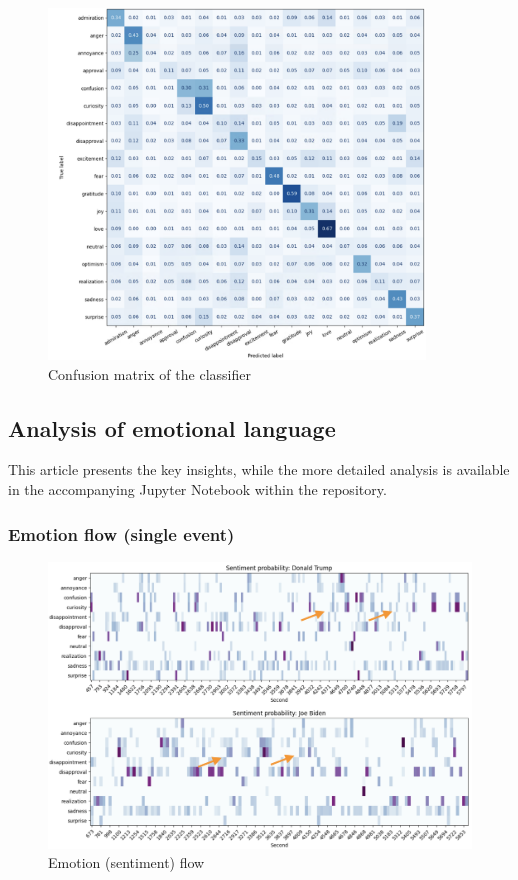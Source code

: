 \documentclass[pdflatex,sn-mathphys-num]{sn-jnl}%
\begin{document}
\begin{figure}[H]
	\centering
	\includegraphics[width=10cm]{f2-confusion_matrix.png}
	\caption{Confusion matrix of the classifier}
\end{figure}

\subsection{Analysis of emotional language}
This article presents the key insights, while the more detailed analysis is available in the accompanying Jupyter Notebook within the repository.

\subsubsection{Emotion flow (single event)}

\begin{figure}[h]
	\centering
	\includegraphics[width=13cm]{f3-emotion_flow.png}
	\caption{Emotion (sentiment)  flow}
\end{figure}
\end{document}
